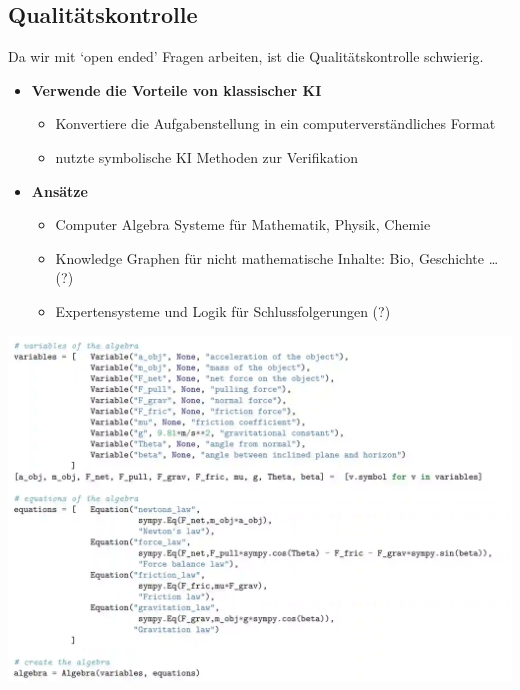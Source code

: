 \documentclass[
  letterpaper,
  DIV=11,
  numbers=noendperiod]{scrartcl}
\providecommand{\tightlist}{%
  \setlength{\itemsep}{0pt}\setlength{\parskip}{0pt}}\usepackage{longtable,booktabs,array}
\begin{document}
\subsection{Qualitätskontrolle}\label{qualituxe4tskontrolle}

Da wir mit `open ended' Fragen arbeiten, ist die Qualitätskontrolle
schwierig.

\begin{itemize}
\tightlist
\item
  \textbf{Verwende die Vorteile von klassischer KI}

  \begin{itemize}
  \tightlist
  \item
    Konvertiere die Aufgabenstellung in ein computerverständliches
    Format
  \item
    nutzte symbolische KI Methoden zur Verifikation
  \end{itemize}
\item
  \textbf{Ansätze}

  \begin{itemize}
  \tightlist
  \item
    Computer Algebra Systeme für Mathematik, Physik, Chemie
  \item
    Knowledge Graphen für nicht mathematische Inhalte: Bio, Geschichte
    \ldots{} (?)
  \item
    Expertensysteme und Logik für Schlussfolgerungen (?)
  \end{itemize}
\end{itemize}

\includegraphics[width=1\textwidth,height=\textheight]{images/computer_algebra.webp}
\end{document}

